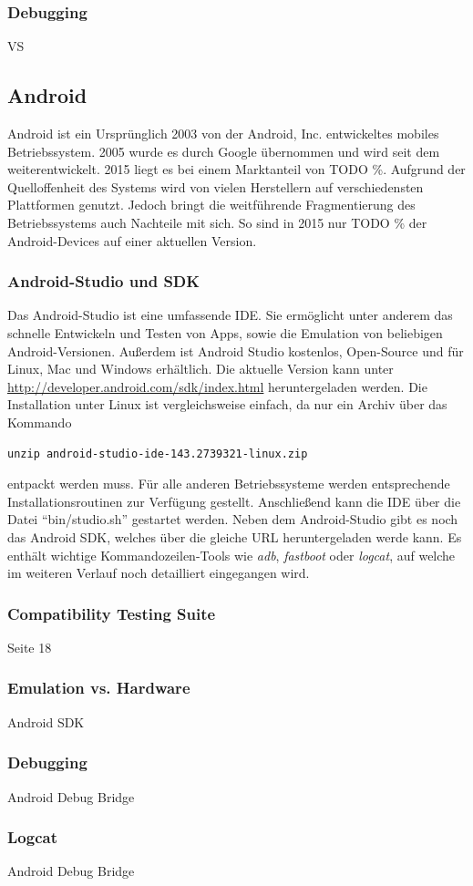 			\subsubsection{Debugging}
			VS	
		\subsection{Android}
			Android ist ein Ursprünglich 2003 von der Android, Inc. entwickeltes mobiles Betriebssystem. 2005 wurde es durch Google übernommen und wird seit dem weiterentwickelt. 2015 liegt es bei einem Marktanteil von TODO \%. Aufgrund der Quelloffenheit des Systems wird von vielen Herstellern auf verschiedensten Plattformen genutzt. Jedoch bringt die weitführende Fragmentierung des Betriebssystems auch Nachteile mit sich. So sind in 2015 nur TODO \% der Android-Devices auf einer aktuellen Version.\cite{Drake2014}
			\subsubsection{Android-Studio und SDK}
			Das Android-Studio ist eine umfassende IDE. Sie ermöglicht unter anderem das schnelle Entwickeln und Testen von Apps, sowie die Emulation von beliebigen Android-Versionen. Außerdem ist Android Studio kostenlos, Open-Source und für Linux, Mac und Windows erhältlich. Die aktuelle Version kann unter \url{http://developer.android.com/sdk/index.html} heruntergeladen werden. Die Installation unter Linux ist vergleichsweise einfach, da nur ein Archiv über das Kommando 
\begin{lstlisting}
unzip android-studio-ide-143.2739321-linux.zip
\end{lstlisting}
entpackt werden muss. Für alle anderen Betriebssysteme werden entsprechende Installationsroutinen zur Verfügung gestellt. Anschließend kann die IDE über die Datei "`bin/studio.sh"' gestartet werden. Neben dem Android-Studio gibt es noch das Android SDK, welches über die gleiche URL heruntergeladen werde kann. Es enthält wichtige Kommandozeilen-Tools wie \textit{adb}, \textit{fastboot} oder \textit{logcat}, auf welche im weiteren Verlauf noch detailliert eingegangen wird.
			\subsubsection{Compatibility Testing Suite}
			\cite{Drake2014} Seite 18
			\subsubsection{Emulation vs. Hardware}
			Android SDK
			\subsubsection{Debugging}	
			Android Debug Bridge\cite{androidDebugBridge}
			\subsubsection{Logcat}	
			Android Debug Bridge\cite{androidDebugBridge}